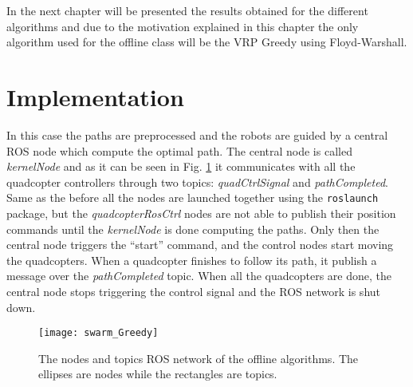 In the next chapter will be presented the results obtained for the different algorithms and due to the motivation explained in this chapter the only algorithm used for the offline class will be the VRP Greedy using Floyd-Warshall.
\pagebreak

\section{Implementation}

In this case the paths are preprocessed and the robots are guided by a central ROS node which compute the optimal path. The central node is called \emph{kernelNode} and as it can be seen in Fig. \ref{fig:nonrt_nodes} it communicates with all the quadcopter controllers through two topics: \emph{quadCtrlSignal} and \emph{pathCompleted}. Same as the before all the nodes are launched together using the \texttt{roslaunch} package, but the \emph{quadcopterRosCtrl} nodes are not able to publish their position commands until the \emph{kernelNode} is done computing the paths. Only then the central node triggers the ``start'' command, and the control nodes start moving the quadcopters. When a quadcopter finishes to follow its path, it publish a message over the \emph{pathCompleted} topic. When all the quadcopters are done, the central node stops triggering the control signal and the ROS network is shut down.


\begin{figure}[h]
\centering
\texttt{[image: swarm\_Greedy]}
\caption[ROS network for the offline algorithms]{The nodes and topics ROS network of the offline algorithms. The ellipses are nodes while the rectangles are topics.}
\label{fig:nonrt_nodes}
\end{figure}



